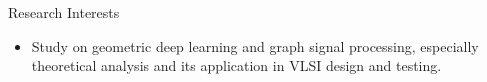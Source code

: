
\begin{rSection}{Research Interests}
    
\begin{itemize}
    \item Study on geometric deep learning and graph signal processing, especially theoretical analysis and its application in VLSI design and testing.
\end{itemize}
\end{rSection}




